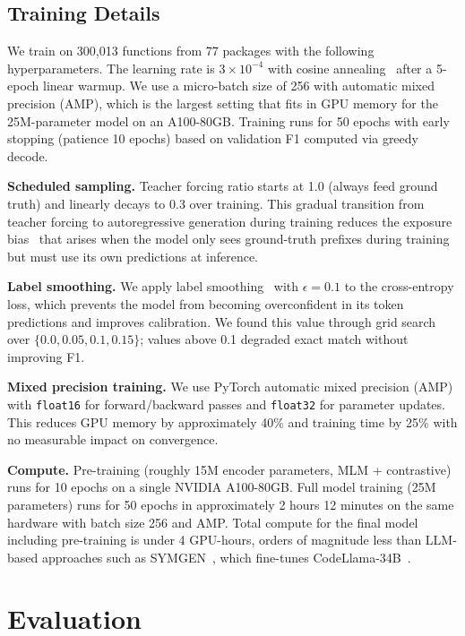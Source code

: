\documentclass[sigconf,nonacm]{acmart}
\begin{document}
\subsection{Training Details}
\label{sec:training}

We train on 300{,}013 functions from 77 packages with the following hyperparameters. The learning rate is $3 \times 10^{-4}$ with cosine annealing~\cite{sgdr} after a 5-epoch linear warmup. We use a micro-batch size of 256 with automatic mixed precision (AMP), which is the largest setting that fits in GPU memory for the 25M-parameter model on an A100-80GB. Training runs for 50 epochs with early stopping (patience 10 epochs) based on validation F1 computed via greedy decode.

\textbf{Scheduled sampling.} Teacher forcing ratio starts at 1.0 (always feed ground truth) and linearly decays to 0.3 over training. This gradual transition from teacher forcing to autoregressive generation during training reduces the exposure bias~\cite{bengio2015scheduled} that arises when the model only sees ground-truth prefixes during training but must use its own predictions at inference.

\textbf{Label smoothing.} We apply label smoothing~\cite{labelsmooth} with $\epsilon = 0.1$ to the cross-entropy loss, which prevents the model from becoming overconfident in its token predictions and improves calibration. We found this value through grid search over $\{0.0, 0.05, 0.1, 0.15\}$; values above 0.1 degraded exact match without improving F1.

\textbf{Mixed precision training.} We use PyTorch automatic mixed precision (AMP) with \texttt{float16} for forward/backward passes and \texttt{float32} for parameter updates. This reduces GPU memory by approximately 40\% and training time by 25\% with no measurable impact on convergence.

\textbf{Compute.} Pre-training (roughly 15M encoder parameters, MLM + contrastive) runs for 10 epochs on a single NVIDIA A100-80GB. Full model training (25M parameters) runs for 50 epochs in approximately 2 hours 12 minutes on the same hardware with batch size 256 and AMP. Total compute for the final model including pre-training is under 4 GPU-hours, orders of magnitude less than LLM-based approaches such as SYMGEN~\cite{symgen}, which fine-tunes CodeLlama-34B~\cite{codellama}.

\section{Evaluation}
\label{sec:eval}
\end{document}
